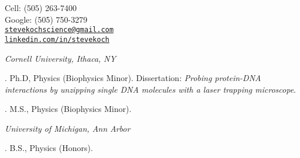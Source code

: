 \documentclass[11pt]{article}
\makeatletter
\def\myemail{stevekochscience@gmail.com}
\def\myweb{http://www.linkedin.com/in/stevekoch/}
\def\mycell{(505) 263-7400}
\def\mygoogle{(505) 750-3279}
\makeatother
\begin{document}
\begin{minipage}[t]{2.95in}
  
\end{minipage}
\hfill     
\hfill
\begin{minipage}[t]{1.7in}
  \flushright \footnotesize Cell: \mycell \\ 
  Google: \mygoogle  \\ 
  {\scriptsize  \texttt{\href{mailto:\myemail}{\myemail}}} \\
  {\scriptsize  \texttt{\href{\myweb}{linkedin.com/in/stevekoch}}}
\end{minipage}


\medskip

\reversemarginpar

\medskip       



\noindent\emph{Cornell University, Ithaca, NY \vspace{0.01in}}

. Ph.D, Physics (Biophysics Minor). Dissertation: \emph{Probing protein-DNA interactions by unzipping single DNA molecules with a laser trapping microscope}. %

. M.S., Physics (Biophysics Minor). 


\medskip
\noindent\emph{University of Michigan, Ann Arbor\vspace{0.02in}}

. B.S., Physics (Honors). \vspace{0.01in}

\bigskip

\medskip
{}
\end{document}

